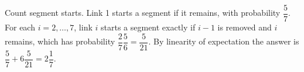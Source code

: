 Count segment starts. Link 1 starts a segment if it remains, with probability $\dfrac{5}{7}$. For each $i=2,\ldots,7$, link $i$ starts a segment exactly if $i-1$ is removed and $i$ remains, which has probability $\dfrac{2}{7}\dfrac{5}{6}=\dfrac{5}{21}$. By linearity of expectation the answer is $\dfrac{5}{7}+6\dfrac{5}{21}=\boxed{2\dfrac{1}{7}}$.
